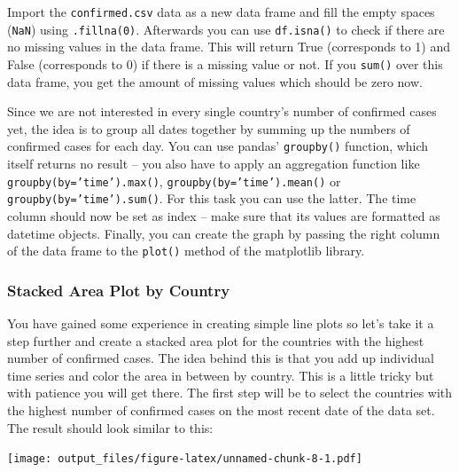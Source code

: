 \documentclass[
  11pt,
]{article}
\newenvironment{tipsp}[1]
  {
  \begin{itemize}
  \footnotesize
  \renewcommand{\labelitemi}{
    \raisebox{-.7\height}[0pt][0pt]{
      {\setkeys{Gin}{width=3em,keepaspectratio}
        \texttt{[image: images/\#1.png]}}
    }
  }
  \setlength{\fboxsep}{1em}
  \begin{pbox}
  \item
  }
  {
  \end{pbox}
  \end{itemize}
  }
\begin{document}
\begin{tipsp}p

Import the \texttt{confirmed.csv} data as a new data frame and fill the empty spaces (\texttt{NaN}) using \texttt{.fillna(0)}. Afterwards you can use \texttt{df.isna()} to check if there are no missing values in the data frame. This will return True (corresponds to 1) and False (corresponds to 0) if there is a missing value or not. If you \texttt{sum()} over this data frame, you get the amount of missing values which should be zero now.

Since we are not interested in every single country's number of confirmed cases yet, the idea is to group all dates together by summing up the numbers of confirmed cases for each day. You can use pandas' \texttt{groupby()} function, which itself returns no result -- you also have to apply an aggregation function like \texttt{groupby(by=’time’).max()}, \texttt{groupby(by=’time’).mean()} or \texttt{groupby(by=’time’).sum()}. For this task you can use the latter.
The time column should now be set as index -- make sure that its values are formatted as datetime objects.
Finally, you can create the graph by passing the right column of the data frame to the \texttt{plot()} method of the matplotlib library.

\end{tipsp}

\hypertarget{stacked-area-plot-by-country}{%
\subsubsection{Stacked Area Plot by Country}\label{stacked-area-plot-by-country}}

You have gained some experience in creating simple line plots so let's take it a step further and create a stacked area plot for the countries with the highest number of confirmed cases. The idea behind this is that you add up individual time series and color the area in between by country. This is a little tricky but with patience you will get there. The first step will be to select the countries with the highest number of confirmed cases on the most recent date of the data set. The result should look similar to this:

\texttt{[image: output\_files/figure-latex/unnamed-chunk-8-1.pdf]}
\end{document}
